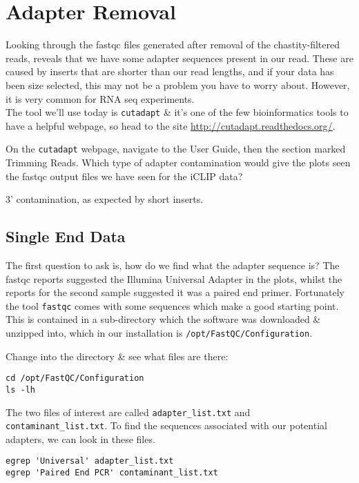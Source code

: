 \section{Adapter Removal}

Looking through the fastqc files generated after removal of the chastity-filtered reads, reveals that we have some adapter sequences present in our read.
These are caused by inserts that are shorter than our read lengths, and if your data has been size selected, this may not be a problem you have to worry about.
However, it is very common for RNA seq experiments.\\

The tool we'll use today is \texttt{cutadapt} \& it's one of the few bioinformatics tools to have a helpful webpage, so head to the site \url{http://cutadapt.readthedocs.org/}.

\begin{questions}
On the \texttt{cutadapt} webpage, navigate to the User Guide, then the section marked Trimming Reads.
Which type of adapter contamination would give the plots seen the fastqc output files we have seen for the iCLIP data?\\
\begin{answer}
3' contamination, as expected by short inserts.
\end{answer}
\end{questions}

\subsection{Single End Data}

The first question to ask is, how do we find what the adapter sequence is?
The fastqc reports suggested the Illumina Universal Adapter in the plots, whilst the reports for the second sample suggested it was a paired end primer.
Fortunately the tool \texttt{fastqc} comes with some sequences which make a good starting point.
This is contained in a sub-directory which the software was downloaded \& unzipped into, which in our installation is \texttt{/opt/FastQC/Configuration}.

\begin{steps}
Change into the directory \& see what files are there:
\begin{lstlisting}
cd /opt/FastQC/Configuration
ls -lh
\end{lstlisting}
\end{steps}

\begin{steps}
The two files of interest are called \texttt{adapter_list.txt} and \texttt{contaminant_list.txt}.
To find the sequences associated with our potential adapters, we can look in these files.
\begin{lstlisting}
egrep 'Universal' adapter_list.txt
egrep 'Paired End PCR' contaminant_list.txt
\end{lstlisting}
\end{steps}

